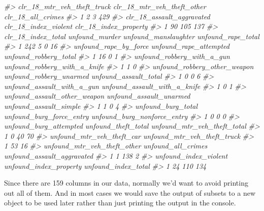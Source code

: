 \documentclass[
  12pt,
]{book}
\newenvironment{Shaded}{\begin{snugshade}}{\end{snugshade}}
\newcommand{\CommentTok}[1]{\textcolor[rgb]{0.56,0.35,0.01}{\textit{#1}}}
\begin{document}
\begin{Shaded}
\begin{Highlighting}[]
\CommentTok{\#>   clr\_18\_mtr\_veh\_theft\_truck clr\_18\_mtr\_veh\_theft\_other clr\_18\_all\_crimes}
\CommentTok{\#> 1                          2                          3               429}
\CommentTok{\#>   clr\_18\_assault\_aggravated clr\_18\_index\_violent clr\_18\_index\_property}
\CommentTok{\#> 1                        90                  105                   137}
\CommentTok{\#>   clr\_18\_index\_total unfound\_murder unfound\_manslaughter unfound\_rape\_total}
\CommentTok{\#> 1                242              5                    0                 16}
\CommentTok{\#>   unfound\_rape\_by\_force unfound\_rape\_attempted unfound\_robbery\_total}
\CommentTok{\#> 1                    16                      0                     1}
\CommentTok{\#>   unfound\_robbery\_with\_a\_gun unfound\_robbery\_with\_a\_knife}
\CommentTok{\#> 1                          1                            0}
\CommentTok{\#>   unfound\_robbery\_other\_weapon unfound\_robbery\_unarmed unfound\_assault\_total}
\CommentTok{\#> 1                            0                       0                     6}
\CommentTok{\#>   unfound\_assault\_with\_a\_gun unfound\_assault\_with\_a\_knife}
\CommentTok{\#> 1                          0                            1}
\CommentTok{\#>   unfound\_assault\_other\_weapon unfound\_assault\_unarmed unfound\_assault\_simple}
\CommentTok{\#> 1                            1                       0                      4}
\CommentTok{\#>   unfound\_burg\_total unfound\_burg\_force\_entry unfound\_burg\_nonforce\_entry}
\CommentTok{\#> 1                  0                        0                           0}
\CommentTok{\#>   unfound\_burg\_attempted unfound\_theft\_total unfound\_mtr\_veh\_theft\_total}
\CommentTok{\#> 1                      0                  40                          70}
\CommentTok{\#>   unfound\_mtr\_veh\_theft\_car unfound\_mtr\_veh\_theft\_truck}
\CommentTok{\#> 1                        53                          16}
\CommentTok{\#>   unfound\_mtr\_veh\_theft\_other unfound\_all\_crimes unfound\_assault\_aggravated}
\CommentTok{\#> 1                           1                138                          2}
\CommentTok{\#>   unfound\_index\_violent unfound\_index\_property unfound\_index\_total}
\CommentTok{\#> 1                    24                    110                 134}
\end{Highlighting}
\end{Shaded}

Since there are 159 columns in our data, normally we'd want to avoid printing out all of them. And in most cases we would save the output of subsets to a new object to be used later rather than just printing the output in the console.
\end{document}

